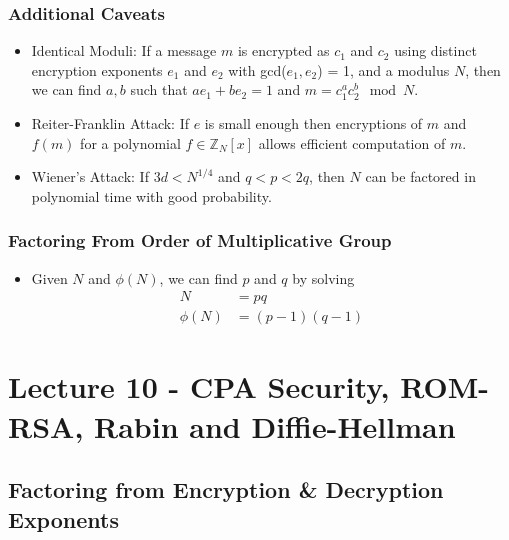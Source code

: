 \documentclass[a4paper]{scrartcl}
\begin{document}
\subsubsection*{Additional Caveats}

\begin{itemize}
\item Identical Moduli: If a message $m$ is encrypted as $c_1$ and $c_2$ using distinct encryption exponents $e_1$ and $e_2$ with gcd($e_1,e_2$) = 1, and a modulus $N$, then we can find $a,b$ such that $ae_1 + be_2 = 1$ and $m = c_1^ac_2^b \mod N$.
\item Reiter-Franklin Attack: If $e$ is small enough then encryptions of $m$ and $f(m)$ for a polynomial $f \in \mathbb{Z}_N[x]$ allows efficient computation of $m$.
\item Wiener's Attack: If $3d < N^{1/4}$ and $q<p<2q$, then $N$ can be factored in polynomial time with good probability. 
\end{itemize}

\subsubsection*{Factoring From Order of Multiplicative Group}

\begin{itemize}
\item Given $N$ and $\phi(N)$, we can find $p$ and $q$ by solving
\begin{align*}
N &= pq \\
\phi(N) &= (p-1)(q-1)
\end{align*}
\end{itemize}

\section*{Lecture 10 - CPA Security, ROM-RSA, Rabin and Diffie-Hellman}

\subsection*{Factoring from Encryption \& Decryption Exponents}
\end{document}
